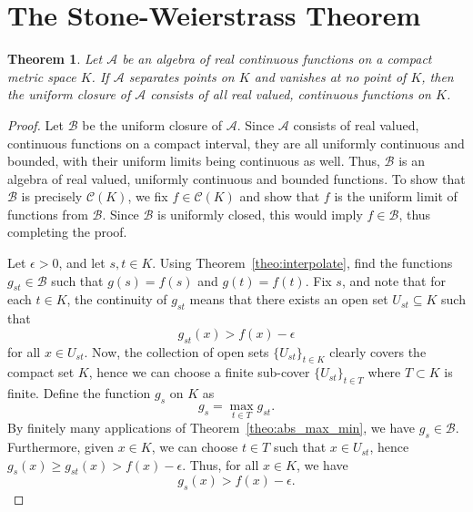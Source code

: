 \documentclass[11pt]{article}
\newtheorem{theorem}{Theorem}[section]
\theoremstyle{definition}
\theoremstyle{remark}
\begin{document}
    \section{The Stone-Weierstrass Theorem}
    \begin{theorem} \label{theo:stone_weierstrass}
        Let $\mathscr{A}$ be an algebra of real continuous functions on a compact
        metric space $K$. If $\mathscr{A}$ separates points on $K$ and vanishes at no
        point of $K$, then the uniform closure of $\mathscr{A}$ consists of all real
        valued, continuous functions on $K$.
    \end{theorem}
    \begin{proof}
        Let $\mathscr{B}$ be the uniform closure of $\mathscr{A}$. Since
        $\mathscr{A}$ consists of real valued, continuous functions on a compact
        interval, they are all uniformly continuous and bounded, with their uniform
        limits being continuous as well. Thus, $\mathscr{B}$ is an algebra of real
        valued, uniformly continuous and bounded functions. To show that
        $\mathscr{B}$ is precisely $\mathscr{C}(K)$, we fix $f \in \mathscr{C}(K)$
        and show that $f$ is the uniform limit of functions from $\mathscr{B}$. Since
        $\mathscr{B}$ is uniformly closed, this would imply $f \in \mathscr{B}$, thus
        completing the proof.

        Let $\epsilon > 0$, and let $s, t \in K$. Using
        Theorem~\ref{theo:interpolate}, find the functions $g_{st} \in \mathscr{B}$
        such that $g(s) = f(s)$ and $g(t) = f(t)$. Fix $s$, and note that for each $t
        \in K$, the continuity of $g_{st}$ means that there exists an open set
        $U_{st} \subseteq K$ such that \[
            g_{st}(x) > f(x) - \epsilon
        \] for all $x \in U_{st}$. Now, the collection of open sets $\{U_{st}\}_{t
        \in K}$ clearly covers the compact set $K$, hence we can choose a finite
        sub-cover $\{U_{st}\}_{t \in T}$ where $T \subset K$ is finite.
        Define the function $g_s$ on $K$ as \[
            g_s = \max_{t \in T} g_{st}.
        \] By finitely many applications of Theorem~\ref{theo:abs_max_min}, we have
        $g_s \in \mathscr{B}$. Furthermore, given $x \in K$, we can choose $t \in T$
        such that $x \in U_{st}$, hence $g_s(x) \geq g_{st}(x) > f(x) - \epsilon$.
        Thus, for all $x \in K$, we have \[
            g_s(x) > f(x) - \epsilon.
        \] 


\end{proof}
\end{document}
